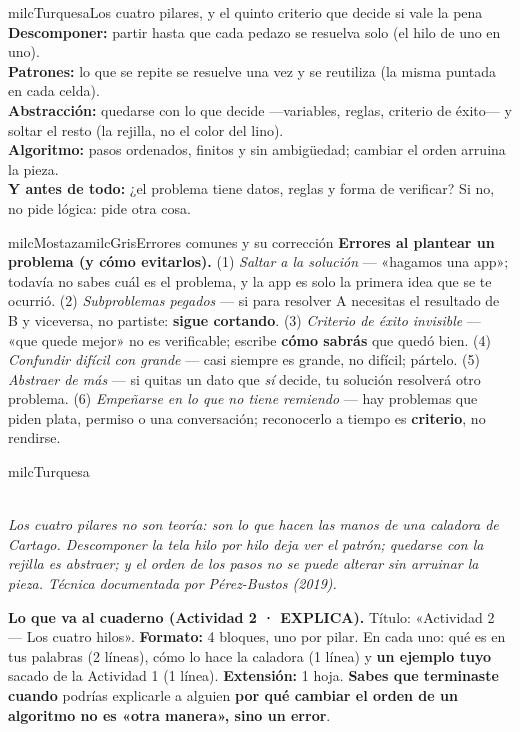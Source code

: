\documentclass[11pt,letterpaper]{article}
\newcommand{\guiaDiagrama}[2]{%
\begin{center}
\\[1.5mm]
{\footnotesize\itshape\textcolor{milcNegro!75}{#2}}
\end{center}
}
\begin{document}
\begin{drawbox}{milcTurquesa}{Los cuatro pilares, y el quinto criterio que decide si vale la pena}
\textbf{Descomponer:} partir hasta que cada pedazo se resuelva solo (el hilo de uno en uno). \\[1mm]
\textbf{Patrones:} lo que se repite se resuelve una vez y se reutiliza (la misma puntada en cada celda). \\[1mm]
\textbf{Abstracción:} quedarse con lo que decide ---variables, reglas, criterio de éxito--- y soltar el resto (la rejilla, no el color del lino). \\[1mm]
\textbf{Algoritmo:} pasos ordenados, finitos y sin ambigüedad; cambiar el orden arruina la pieza. \\[1mm]
\textbf{Y antes de todo:} ¿el problema tiene datos, reglas y forma de verificar? Si no, no pide lógica: pide otra cosa.
\end{drawbox}

\begin{softbox}{milcMostaza}{milcGris}{Errores comunes y su corrección}
\textbf{Errores al plantear un problema (y cómo evitarlos).} (1) \emph{Saltar a la solución} --- «hagamos una app»; todavía no sabes cuál es el problema, y la app es solo la primera idea que se te ocurrió. (2) \emph{Subproblemas pegados} --- si para resolver A necesitas el resultado de B y viceversa, no partiste: \textbf{sigue cortando}. (3) \emph{Criterio de éxito invisible} --- «que quede mejor» no es verificable; escribe \textbf{cómo sabrás} que quedó bien. (4) \emph{Confundir difícil con grande} --- casi siempre es grande, no difícil; pártelo. (5) \emph{Abstraer de más} --- si quitas un dato que \emph{sí} decide, tu solución resolverá otro problema. (6) \emph{Empeñarse en lo que no tiene remiendo} --- hay problemas que piden plata, permiso o una conversación; reconocerlo a tiempo es \textbf{criterio}, no rendirse.
\end{softbox}

\begin{infoband}{milcTurquesa}
\guiaDiagrama{assets/pensamiento-computacional-1/rejilla-calado.tex}{Los cuatro pilares no son teoría: son lo que hacen las manos de una caladora de Cartago. Descomponer la tela hilo por hilo deja ver el patrón; quedarse con la rejilla es abstraer; y el orden de los pasos no se puede alterar sin arruinar la pieza. Técnica documentada por Pérez-Bustos (2019).}

\textbf{Lo que va al cuaderno (Actividad 2 · EXPLICA).} Título: «Actividad 2 --- Los cuatro hilos». \textbf{Formato:} 4 bloques, uno por pilar. En cada uno: qué es en tus palabras (2 líneas), cómo lo hace la caladora (1 línea) y \textbf{un ejemplo tuyo} sacado de la Actividad 1 (1 línea). \textbf{Extensión:} 1 hoja. \textbf{Sabes que terminaste cuando} podrías explicarle a alguien \textbf{por qué cambiar el orden de un algoritmo no es «otra manera», sino un error}.
\end{infoband}
\end{document}
